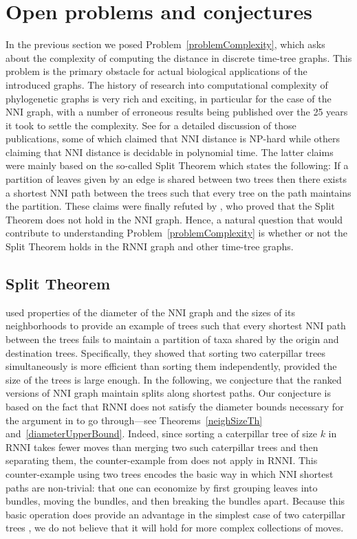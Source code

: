 \documentclass[11pt]{amsart}
\theoremstyle{definition}
\newcommand{\nni}{\mathrm{NNI}}
\newcommand{\rnni}{\mathrm{RNNI}}
\providecommand{\DIFaddtex}[1]{{\protect\color{blue}\uwave{#1}}} %
\providecommand{\DIFaddbegin}{} %
\providecommand{\DIFaddend}{} %
\providecommand{\DIFadd}[1]{\texorpdfstring{\DIFaddtex{#1}}{#1}} %
\begin{document}
\section{Open problems and conjectures}

In the previous section we posed Problem~\ref{problemComplexity}, which asks about the complexity of computing the distance in discrete time-tree graphs.
This problem is the primary obstacle for actual biological applications of the introduced graphs.
The history of research into computational complexity of phylogenetic graphs is very rich and exciting, in particular for the case of the $\nni$ graph, with a number of erroneous results being published over the 25 years it took to settle the complexity.
See \autocite{Dasgupta2000-xa} for a detailed discussion of those publications, some of which claimed that $\nni$ distance is NP-hard while others claiming that $\nni$ distance is decidable in polynomial time.
The latter claims were mainly based on the so-called Split Theorem which states the following:
If a partition of leaves given by an edge is shared between two trees then there exists a shortest $\nni$ path between the trees such that every tree on the path maintains the partition.
These claims were finally refuted by \textcite{li1996some}, who proved that the Split Theorem does not hold in the $\nni$ graph.
Hence, a natural question that would contribute to understanding Problem~\ref{problemComplexity} is whether or not the Split Theorem holds in the $\rnni$ graph and other time-tree graphs.


\subsection{Split Theorem}

\textcite{li1996some} used properties of the diameter of the $\nni$ graph and the sizes of its neighborhoods to provide an example of trees such that every shortest $\nni$ path between the trees fails to maintain a partition of taxa shared by the origin and destination trees.
Specifically, they showed that sorting two caterpillar trees simultaneously is more efficient than sorting them independently, provided the size of the trees is large enough.
In the following, we conjecture that the ranked versions of $\nni$ graph maintain splits along shortest paths.
Our conjecture is based on the fact that $\rnni$ does not satisfy the diameter bounds necessary for the argument in \autocite{li1996some} to go through---see Theorems~\ref{neighSizeTh} and~\ref{diameterUpperBound}.
Indeed, since sorting a caterpillar tree of size $k$ in $\rnni$ takes fewer moves than merging two such caterpillar trees and then separating them, the counter-example from \autocite{li1996some} does not apply in $\rnni$.
This counter-example using two trees encodes the basic way in which $\nni$ shortest paths are non-trivial: that one can economize by first grouping leaves into bundles, moving the bundles, and then breaking the bundles apart.
Because this basic operation does \DIFaddbegin \DIFadd{not }\DIFaddend provide an advantage in the simplest case of two caterpillar trees \DIFaddbegin \DIFadd{in $\rnni$}\DIFaddend , we do not believe that it will hold for more complex collections of moves.
\end{document}
